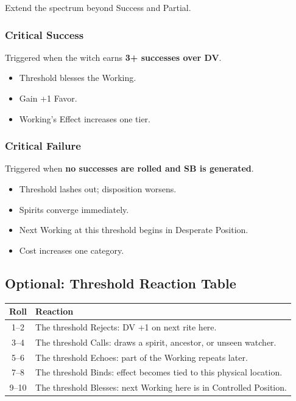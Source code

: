 \documentclass[11pt]{book}
\begin{document}
Extend the spectrum beyond Success and Partial.

\subsubsection*{Critical Success}
Triggered when the witch earns \textbf{3+ successes over DV}.

\begin{itemize}[noitemsep]
    \item Threshold blesses the Working.
    \item Gain +1 Favor.
    \item Working's Effect increases one tier.
\end{itemize}

\subsubsection*{Critical Failure}
Triggered when \textbf{no successes are rolled and SB is generated}.

\begin{itemize}[noitemsep]
    \item Threshold lashes out; disposition worsens.
    \item Spirits converge immediately.
    \item Next Working at this threshold begins in Desperate Position.
    \item Cost increases one category.
\end{itemize}


\subsection*{Optional: Threshold Reaction Table}

\begin{center}
\begin{longtable}{c p{}}
\toprule
\textbf{Roll} & \textbf{Reaction} \\
\midrule
1--2 & The threshold Rejects: DV +1 on next rite here. \\
3--4 & The threshold Calls: draws a spirit, ancestor, or unseen watcher. \\
5--6 & The threshold Echoes: part of the Working repeats later. \\
7--8 & The threshold Binds: effect becomes tied to this physical location. \\
9--10 & The threshold Blesses: next Working here is in Controlled Position. \\
\bottomrule
\end{longtable}
\end{center}
\end{document}
